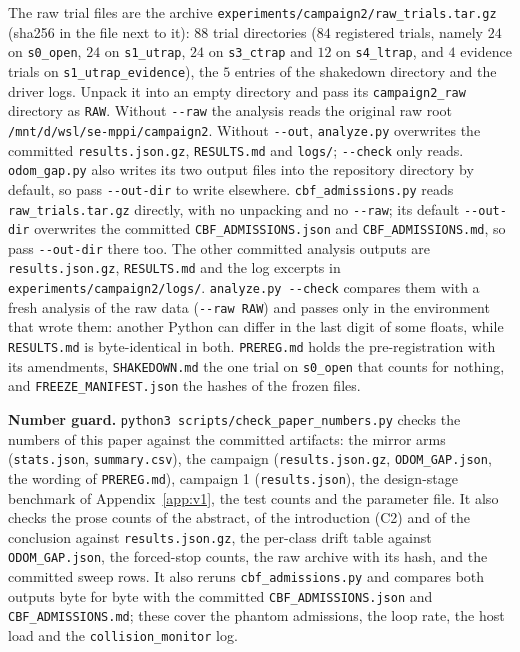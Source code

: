 \documentclass[journal]{IEEEtran}
\begin{document}
\noindent The raw trial files are the archive \texttt{experiments/campaign2/raw\_trials.tar.gz}
(sha256 in the file next to it): $88$ trial directories ($84$ registered trials, namely $24$ on
\texttt{s0\_open}, $24$ on \texttt{s1\_utrap}, $24$ on \texttt{s3\_ctrap} and $12$ on
\texttt{s4\_ltrap}, and $4$ evidence trials on \texttt{s1\_utrap\_evidence}), the $5$ entries of
the shakedown directory and the driver logs. Unpack it into an empty directory and pass its
\texttt{campaign2\_raw} directory as \texttt{RAW}. Without \texttt{-{}-raw} the analysis reads the
original raw root \texttt{/mnt/d/wsl/se-mppi/campaign2}. Without \texttt{-{}-out},
\texttt{analyze.py} overwrites the committed \texttt{results.json.gz}, \texttt{RESULTS.md} and
\texttt{logs/}; \texttt{-{}-check} only reads. \texttt{odom\_gap.py} also writes its two
output files into the repository directory by default, so pass \texttt{-{}-out-dir} to write elsewhere. \texttt{cbf\_admissions.py} reads
\texttt{raw\_trials.tar.gz} directly, with no unpacking and no \texttt{-{}-raw}; its default
\texttt{-{}-out-dir} overwrites the committed \texttt{CBF\_ADMISSIONS.json} and
\texttt{CBF\_ADMISSIONS.md}, so pass \texttt{-{}-out-dir} there too.
The other committed analysis outputs are \texttt{results.json.gz}, \texttt{RESULTS.md} and the log
excerpts in \texttt{experiments/campaign2/logs/}. \texttt{analyze.py -{}-check} compares them with a
fresh analysis of the raw data (\texttt{-{}-raw RAW}) and passes only in the environment that wrote them: another Python can differ
in the last digit of some floats, while \texttt{RESULTS.md} is byte-identical in both.
\texttt{PREREG.md} holds the pre-registration with its amendments, \texttt{SHAKEDOWN.md} the one trial on
\texttt{s0\_open} that counts for nothing, and \texttt{FREEZE\_MANIFEST.json} the hashes of the frozen files.

\textbf{Number guard.} \texttt{python3 scripts/check\_paper\_numbers.py} checks the numbers of
this paper against the committed artifacts: the mirror arms (\texttt{stats.json}, \texttt{summary.csv}),
the campaign (\texttt{results.json.gz}, \texttt{ODOM\_GAP.json}, the wording of \texttt{PREREG.md}),
campaign 1 (\texttt{results.json}), the design-stage benchmark of Appendix~\ref{app:v1}, the test counts
and the parameter file. It also checks the prose counts of the abstract, of the introduction (C2) and of the
conclusion against \texttt{results.json.gz}, the per-class drift table against \texttt{ODOM\_GAP.json}, the
forced-stop counts, the raw archive with its hash, and the committed sweep rows. It also reruns
\texttt{cbf\_admissions.py} and compares both outputs byte for byte with the committed
\texttt{CBF\_ADMISSIONS.json} and \texttt{CBF\_ADMISSIONS.md}; these cover the phantom admissions, the
loop rate, the host load and the \texttt{collision\_monitor} log.
\end{document}
